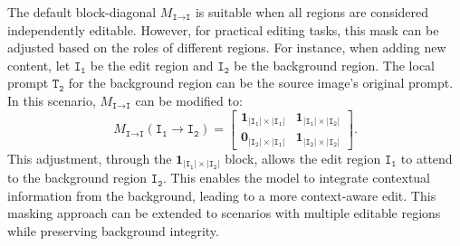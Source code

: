 \documentclass{article}
\begin{document}
The default block-diagonal $M_{\texttt{I}\to\texttt{I}}$ is suitable when all regions are considered independently editable. However, for practical editing tasks, this mask can be adjusted based on the roles of different regions. For instance, when adding new content, let $\texttt{I}_\texttt{1}$ be the edit region and $\texttt{I}_\texttt{2}$ be the background region. The local prompt $\texttt{T}_\texttt{2}$ for the background region can be the source image's original prompt. In this scenario, $M_{\texttt{I}\to\texttt{I}}$ can be modified to:
\begin{equation}
    M_{\texttt{I}\to\texttt{I}}(\texttt{I}_\texttt{1}\to\texttt{I}_\texttt{2})%
    =
    \begin{bmatrix}
        \mathbf{1}_{|\texttt{I}_\texttt{1}|\times|\texttt{I}_\texttt{1}|} &  \mathbf{1}_{|\texttt{I}_\texttt{1}|\times|\texttt{I}_\texttt{2}|}\\
        \mathbf{0}_{|\texttt{I}_\texttt{2}|\times|\texttt{I}_\texttt{1}|} &  \mathbf{1}_{|\texttt{I}_\texttt{2}|\times|\texttt{I}_\texttt{2}|}
    \end{bmatrix}.
    \label{eq:i2i_1}
\end{equation}
This adjustment, through the $\mathbf{1}_{|\texttt{I}_\texttt{1}|\times|\texttt{I}_\texttt{2}|}$ block, allows the edit region $\texttt{I}_\texttt{1}$ to attend to the background region $\texttt{I}_\texttt{2}$. This enables the model to integrate contextual information from the background, leading to a more context-aware edit. This masking approach can be extended to scenarios with multiple editable regions while preserving background integrity.

\end{document}
